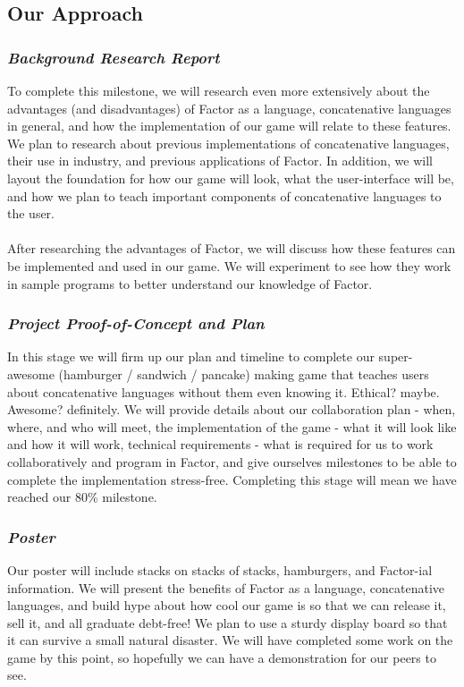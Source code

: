 \documentclass{sig-alternate}
\begin{document}
\subsection{Our Approach}
\subsubsection*{\textit{Background Research
Report}}To complete this milestone, we will research even more
extensively about the advantages (and disadvantages) of Factor as a
language, concatenative languages in general, and how the
implementation of our game will relate to these features. We plan to
research about previous implementations of concatenative languages,
their use in industry, and previous applications of Factor. In
addition, we will layout the foundation for how our game will look,
what the user-interface will be, and how we plan to teach important
components of concatenative languages to the user.\\\\ After researching
the advantages of Factor, we will discuss how these features can be
implemented and used in our game. We will experiment to see how they
work in sample programs to better understand our knowledge of Factor.

\subsubsection*{\textit{Project Proof-of-Concept and Plan}}In this
stage we will firm up our plan and timeline to complete our super-
awesome (hamburger / sandwich / pancake) making game that teaches
users about concatenative languages without them even knowing it.
Ethical? maybe. Awesome? definitely. We will provide details about our
collaboration plan - when, where, and who will meet, the
implementation of the game - what it will look like and how it will
work, technical requirements - what is required for us to work
collaboratively and program in Factor, and give ourselves milestones
to be able to complete the implementation stress-free. Completing this
stage will mean we have reached our 80\% milestone.

\subsubsection*{\textit{Poster}} Our poster will include stacks on
stacks of stacks, hamburgers, and Factor-ial information. We will
present the benefits of Factor as a language, concatenative
languages, and build hype about how cool our game is so that we can
release it, sell it, and all graduate debt-free! We plan to use a
sturdy display board so that it can survive a small natural disaster.
We will have completed some work on the game by this point, so
hopefully we can have a demonstration for our peers to see.
\end{document}
